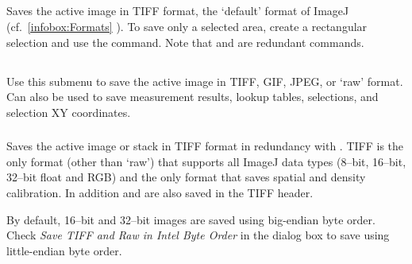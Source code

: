 \subsection{\protect{}\label{sub:Save[s]}}

Saves the active image in TIFF format, the `default' format of ImageJ
(cf.\ \ref{infobox:Formats} ). To save
only a selected area, create a rectangular selection and use the 
command. Note that  and {\small {}}
are redundant commands.


\subsection{\protect{}\label{sub:SaveAs}}

Use this submenu to save the active image in TIFF, GIF, JPEG, or `raw'
format. Can also be used to save measurement results, lookup tables,
selections, and selection XY coordinates.


\subsubsection{\protect{}\label{sub:Tiff...}}

Saves the active image or stack in TIFF format in redundancy
with {\small {}.}
TIFF is the only format (other than `raw') that supports all ImageJ
data types (8--bit, 16--bit, 32--bit float and RGB) and the only format
that saves spatial and density calibration. In addition 
and  are also saved in the TIFF header. 

By default, 16--bit and 32--bit images are saved using big-endian
byte order. Check \emph{Save TIFF and Raw in Intel Byte Order} in
the 
dialog box to save using little-endian byte order. 




\subsubsection[\protect\userinterface{Gif\ldots{}}]{\protect{}\label{sub:Gif...}\improvement{}}

